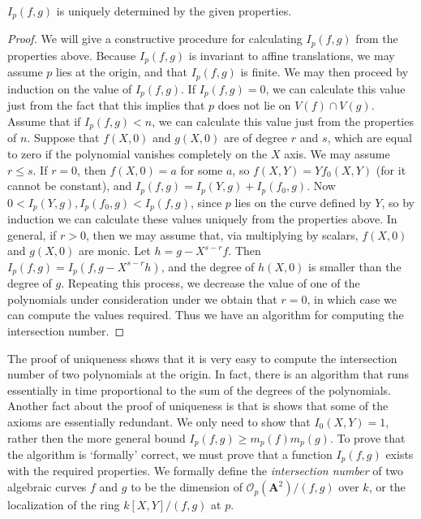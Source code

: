 \begin{theorem}
    $I_p(f,g)$ is uniquely determined by the given properties.
\end{theorem}
\begin{proof}
    We will give a constructive procedure for calculating $I_p(f,g)$ from the properties above. Because $I_p(f,g)$ is invariant to affine translations, we may assume $p$ lies at the origin, and that $I_p(f,g)$ is finite. We may then proceed by induction on the value of $I_p(f,g)$. If $I_p(f,g) = 0$, we can calculate this value just from the fact that this implies that $p$ does not lie on $V(f) \cap V(g)$. Assume that if $I_p(f,g) < n$, we can calculate this value just from the properties of $n$. Suppose that $f(X,0)$ and $g(X,0)$ are of degree $r$ and $s$, which are equal to zero if the polynomial vanishes completely on the $X$ axis. We may assume $r \leq s$. If $r = 0$, then $f(X,0) = a$ for some $a$, so $f(X,Y) = Yf_0(X,Y)$ (for it cannot be constant), and $I_p(f,g) = I_p(Y,g) + I_p(f_0,g)$. Now $0 < I_p(Y,g), I_p(f_0,g) < I_p(f,g)$, since $p$ lies on the curve defined by $Y$, so by induction we can calculate these values uniquely from the properties above. In general, if $r > 0$, then we may assume that, via multiplying by scalars, $f(X,0)$ and $g(X,0)$ are monic. Let $h = g - X^{s-r}f$. Then $I_p(f,g) = I_p(f,g-X^{s-r}h)$, and the degree of $h(X,0)$ is smaller than the degree of $g$. Repeating this process, we decrease the value of one of the polynomials under consideration under we obtain that $r = 0$, in which case we can compute the values required. Thus we have an algorithm for computing the intersection number.
\end{proof}

The proof of uniqueness shows that it is very easy to compute the intersection number of two polynomials at the origin. In fact, there is an algorithm that runs essentially in time proportional to the sum of the degrees of the polynomials. Another fact about the proof of uniqueness is that is shows that some of the axioms are essentially redundant. We only need to show that $I_0(X,Y) = 1$, rather then the more general bound $I_p(f,g) \geq m_p(f) m_p(g)$. To prove that the algorithm is `formally' correct, we must prove that a function $I_p(f,g)$ exists with the required properties. We formally define the \emph{intersection number} of two algebraic curves $f$ and $g$ to be the dimension of $\mathcal{O}_p(\mathbf{A}^2)/(f,g)$ over $k$, or the localization of the ring $k[X,Y]/(f,g)$ at $p$.

